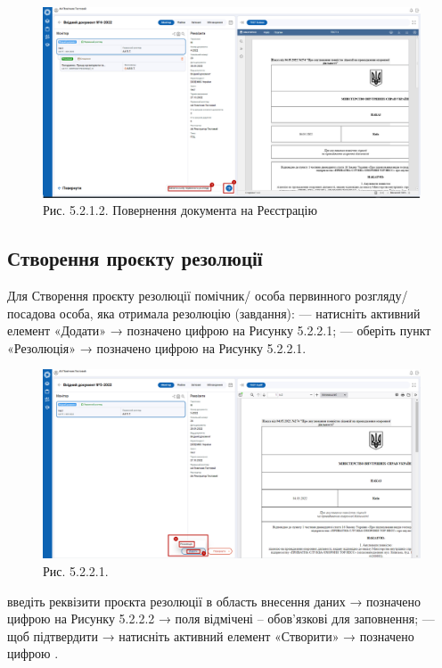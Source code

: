 \begin{figure}[!htbp]
\centerline{\includegraphics[width=\textwidth]{img/5.2.1.2.png}}
\caption{Рис. 5.2.1.2. Повернення документа на Реєстрацію}
\end{figure}

\subsection{Створення проєкту резолюції}

Для Створення проєкту резолюції помічник/ особа первинного розгляду/ посадова особа, яка отримала резолюцію (завдання):
--- натисніть активний елемент «Додати» → позначено цифрою  на Рисунку 5.2.2.1;
--- оберіть пункт «Резолюція» → позначено цифрою  на Рисунку 5.2.2.1.

\begin{figure}[!htbp]
\centerline{\includegraphics[width=\textwidth]{img/5.2.2.1.png}}
\caption{Рис. 5.2.2.1.}
\end{figure}

введіть реквізити проєкта резолюції в область внесення даних → позначено цифрою 
на Рисунку 5.2.2.2 → поля відмічені \circled{$\ast$} – обов'язкові для заповнення;
--- щоб підтвердити → натисніть активний елемент «Створити» → позначено цифрою .

